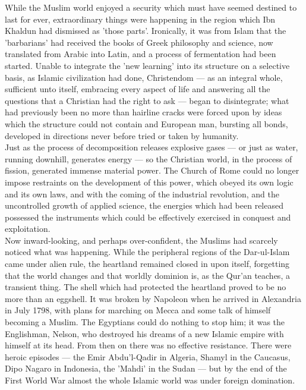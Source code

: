 \documentclass[10pt, twoside,openright]{book}
\begin{document}
While the Muslim world enjoyed a security which must have seemed destined to last for ever, extraordinary things were happening in the region which Ibn Khaldun had dismissed as 'those parts'. Ironically, it was from Islam that the 'barbarians' had received the books of Greek philosophy and science, now translated from Arabic into Latin, and a process of fermentation had been started. Unable to integrate the 'new learning' into its structure on a selective basis, as Islamic civilization had done, Christendom --- as an integral whole, sufficient unto itself, embracing every aspect of life and answering all the questions that a Christian had the right to ask --- began to disintegrate; what had previously been no more than hairline cracks were forced upon by ideas which the structure could not contain and European man, bursting all bonds, developed in directions never before tried or taken by humanity. \\

Just as the process of decomposition releases explosive gases --- or just as water, running downhill, generates energy --- so the Christian world, in the process of fission, generated immense material power. The Church of Rome could no longer impose restraints on the development of this power, which obeyed its own logic and its own laws, and with the coming of the industrial revolution, and the uncontrolled growth of applied science, the energies which had been released possessed the instruments which could be effectively exercised in conquest and exploitation. \\

Now inward\hyp{}looking, and perhaps over\hyp{}confident, the Muslims had scarcely noticed what was happening. While the peripheral regions of the Dar\hyp{}ul\hyp{}Islam came under alien rule, the heartland remained closed in upon itself, forgetting that the world changes and that worldly dominion is, as the Qur'an teaches, a transient thing. The shell which had protected the heartland proved to be no more than an eggshell. It was broken by Napoleon when he arrived in Alexandria in July 1798, with plans for marching on Mecca and some talk of himself becoming a Muslim. The Egyptians could do nothing to stop him; it was the Englishman, Nelson, who destroyed his dreams of a new Islamic empire with himself at its head. From then on there was no effective resistance. There were heroic episodes --- the Emir Abdu'l\hyp{}Qadir in Algeria, Shamyl in the Caucasus, Dipo Nagaro in Indonesia, the 'Mahdi' in the Sudan --- but by the end of the First World War almost the whole Islamic world was under foreign domination. \\
\end{document}
